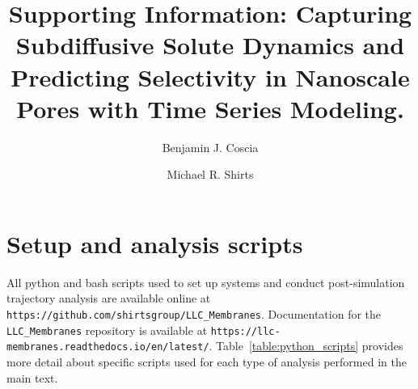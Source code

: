 \documentclass{article}
\title{Supporting Information: Capturing Subdiffusive Solute Dynamics and 
Predicting Selectivity in Nanoscale Pores with Time Series Modeling.}
\author{Benjamin J. Coscia \and Michael R. Shirts}
\begin{document}
  \maketitle
  \tableofcontents
  \graphicspath{{./supporting_figures/}}
  
  
  \newpage  
  
  \section{Setup and analysis scripts}\label{section:python_scripts}

  All python and bash scripts used to set up systems and conduct post-simulation trajectory
  analysis are available online at \texttt{https://github.com/shirtsgroup/LLC\_Membranes}.
  Documentation for the \texttt{LLC\_Membranes} repository is available at
  \texttt{https://llc-membranes.readthedocs.io/en/latest/}. Table~\ref{table:python_scripts}
  provides more detail about specific scripts used for each type of analysis performed in
  the main text.
\end{document}
